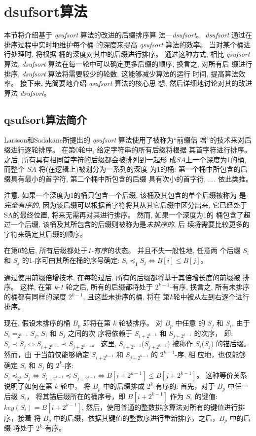 \section{dsufsort算法}
\label{sec:3_Algorithm}

本节将介绍基于 \emph{qsufsort} 算法的改进的后缀排序算
法---\emph{dsufsort}。 \emph{dsufsort} 通过在排序过程中实时地维护每个桶
的深度来提高 \emph{qsufsort} 算法的效率。 当对某个桶进行处理时, 将根据
桶的深度对其中的后缀进行排序。 通过这种方式, 相比 \emph{qsufsort} 算法,
\emph{dsufsort} 算法在每一轮中可以确定更多后缀的顺序, 换言之, 对所有后
缀进行排序, \emph{dsufsort} 算法将需要较少的轮数, 这能够减少算法的运行
时间, 提高算法效率。 接下来, 先简要地介绍 \emph{qsufsort} 算法的核心思
想, 然后详细地讨论对其的改进算法 \emph{dsufsort}。

\subsection{qsufsort算法简介}
\label{sec:qsufsort}

Larsson和Sadakane所提出的 \emph{qsufsort} 算法使用了被称为“前缀倍
增”的技术来对后缀进行逐轮排序。 在第0轮中, 给定字符串的所有后缀将根据
其首字符进行排序。 之后, 所有具有相同首字符的后缀都会被排列到一起形
成$SA$上一个深度为1的桶, 而整个 $SA$ 将(在逻辑上)被划分为一系列的深度
为1的桶: 第一个桶中所包含的后缀具有最小的首字符, 第二个桶中所包含的后缀
具有次小的首字符, .... 依此类推。

注意, 如果一个深度为1的桶只包含一个后缀, 该桶及其包含的单个后缀被称为
是\emph{完全有序的}, 因为该后缀可以根据首字符将其从其它后缀中区分出来,
它已经处于SA的最终位置, 将来无需再对其进行排序。 然而, 如果一个深度为1的
桶包含了超过一个后缀, 该桶及其所包含的后缀则被称为是\emph{未排序的}, 后
续将需要比较更多的字符来确定其后缀的顺序。

在第0轮后, 所有后缀都处于\emph{1-有序}的状态。 并且不失一般性地, 任意两
个后缀 $S_i$ 和 $S_j$ 的1-序可由其所在桶的序号确定:
$S_i \preceq_1 S_j \iff B[i] \leq B[j]$。

通过使用前缀倍增技术, 在每轮过后, 所有的后缀都将基于其倍增长度的前缀被
排序。 这样, 在第 \emph{k-1} 轮之后, 所有的后缀都将处于 $2^{k-1}$-有序,
换言之, 所有未排序的桶都有同样的深度 $2^{k-1}$, 且这些未排序的桶, 将在
第$k$轮中被从左到右逐个进行排序。

现在, 假设未排序的桶 $B_p$ 即将在第 $k$ 轮被排序。 对 $B_p$ 中任意
的 $S_j$ 和 $S_i$, 由于 $S_i =_{2^{k-1}} S_j$, $S_i$ 和 $S_j$ 之间的次
序将依赖于 $S_{i+2^{k-1}}$ 和 $S_{j+2^{k-1}}$ 的次序， 即:
$S_i \prec S_j \iff S_{i+2^{k-1}} \prec S_{j+2^{k-1}}$。 这里,
$S_{i+2^{k-1}}$($S_{j+2^{k-1}}$) 被称作 $S_i$($S_j$) 的锚后缀。 然而，由
于当前仅能够确定 $S_{i+2^{k-1}}$ 和 $S_{j+2^{k-1}}$ 的 $2^{k-1}$-序, 相
应地，也仅能够确定 $S_i$ 和 $S_j$ 的 $2^k$-序:
$S_i \preceq_{2^k} S_j \iff S_{i+2^{k-1}} \preceq S_{j+2^{k-1}} \iff
B[i+2^{k-1}] \leq B[j+2^{k-1}]$。  这种等价关系说明了如何在第 $k$ 轮中，
将 $B_p$ 中的后缀排成 $2^k$-有序的: 首先，对于 $B_p$ 中任一后缀 $S_i$，
将其锚后缀所在的桶序号，即 $B[i+2^{k-1}]$ 作为 $S_i$ 的键值: $key(S_i)
= B[i+2^{k-1}]$, 然后，使用普通的整数排序算法对所有的键值进行排序，接着
将 $B_p$ 中的后缀，依据其键值的整数序进行重新排序，之后，$B_p$ 中的后缀
将处于 $2^k$-有序。

